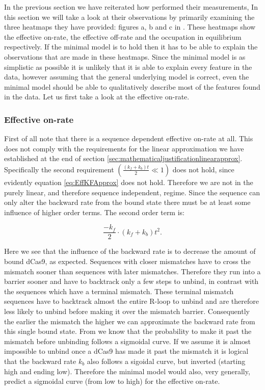 In the previous section we have reiterated how \cite{PNAS} performed their measurements, In this section we will take a look at their observations by primarily examining the three heatmaps they have provided: figures a, b and c in \cite{PNAS}. %
These heatmaps show the effective on-rate, the effective off-rate and the occupation in equilibrium respectively. If the minimal model is to hold then it has to be able to explain the observations that are made in these heatmaps. Since the minimal model is as simplistic as possible it is unlikely that it is able to explain every feature in the data, however assuming that the general underlying model is correct, even the minimal model should be able to qualitatively describe most of the features found in the data. Let us first take a look at the effective on-rate.

\subsubsection{Effective on-rate}

First of all note that there is a sequence dependent effective on-rate at all. This does not comply with the requirements for the linear approximation we have established at the end of section \ref{sec:mathematicaljustificationlinearapprox}. Specifically the second requirement $\left( \frac{(k_f+k_b)t}{2} \ll 1 \right)$ does not hold, since evidently equation \ref{eq:EffKFApprox} does not hold. Therefore we are not in the purely linear, and therefore sequence independent, regime. Since the sequence can only alter the backward rate from the bound state there must be at least some influence of higher order terms. The second order term is:

\begin{equation}
\frac{-k_f}{2} \cdot (k_f+k_b)t^2.
\end{equation}

Here we see that the influence of the backward rate is to decrease the amount of bound dCas9, as expected. Sequences with closer mismatches have to cross the mismatch sooner than sequences with later mismatches. Therefore they run into a barrier sooner and have to backtrack only a few steps to unbind, in contrast with the sequences which have a terminal mismatch. These terminal mismatch sequences have to backtrack almost the entire R-loop to unbind and are therefore less likely to unbind before making it over the mismatch barrier. Consequently the earlier the mismatch the higher we can approximate the backward rate from this single bound state. From \cite{Misha} we know that the probability to make it past the mismatch before unbinding follows a sigmoidal curve. If we assume it is almost impossible to unbind once a dCas9 has made it past the mismatch it is logical that the backward rate $k_b$ also follows a sigoidal curve, but inverted (starting high and ending low). Therefore the minimal model would also, very generally, predict a sigmoidal curve (from low to high) for the effective on-rate.

